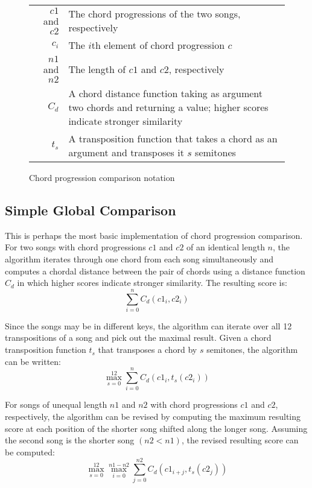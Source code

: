 \begin{figure}[h]
\centering
\begin{tabular}{rl}
${c1}$ and ${c2}$   & The chord progressions of the two songs, respectively \\
$c_i$               & The $i$th element of chord progression $c$ \\
${n1}$ and ${n2}$   & The length of ${c1}$ and ${c2}$, respectively \\
$C_d$               & A chord distance function taking as argument two chords and returning a value; higher scores indicate stronger similarity  \\
$t_s$               & A transposition function that takes a chord as an argument and transposes it $s$ semitones \\

\bottomrule
\end{tabular}
\caption{Chord progression comparison notation}
\label{fig:comparenotation}
\end{figure}

\subsection{Simple Global Comparison}

This is perhaps the most basic implementation of chord progression comparison. For two songs with chord progressions ${c1}$ and ${c2}$ of an identical length $n$, the algorithm iterates through one chord from each song simultaneously and computes a chordal distance between the pair of chords using a distance function $C_d$ in which higher scores indicate stronger similarity. The resulting score is: \[ \sum_{i=0}^n C_d({c1}_i, c2_i) \]

Since the songs may be in different keys, the algorithm can iterate over all 12 transpositions of a song and pick out the maximal result. Given a chord transposition function $t_s$ that transposes a chord by $s$ semitones, the algorithm can be written: \[ \max_{s=0}^{12} \sum_{i=0}^n C_d({c1}_i, t_s({c2}_i)) \]

For songs of unequal length ${n1}$ and ${n2}$ with chord progressions ${c1}$ and ${c2}$, respectively, the algorithm can be revised by computing the maximum resulting score at each position of the shorter song shifted along the longer song. Assuming the second song is the shorter song $({n2} < {n1})$, the revised resulting score can be computed: \[ \max_{s=0}^{12} \max_{i=0}^{{n1} - {n2}} \sum_{j=0}^{n2} C_d({c1}_{i+j}, t_s({c2}_j)) \]

